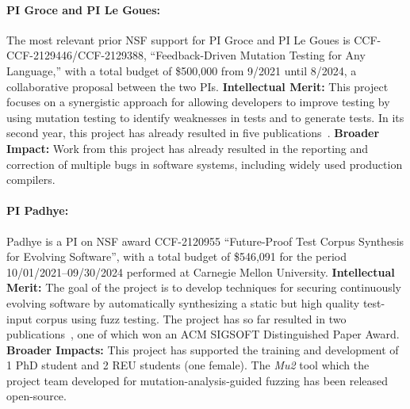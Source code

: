\paragraph{PI Groce and PI Le Goues:}
The most relevant prior NSF support for PI Groce and PI Le Goues is CCF-
CCF-2129446/CCF-2129388, ``Feedback-Driven Mutation Testing for Any Language,'' with a 
total budget of \$500,000 from 9/2021 until 8/2024,
a collaborative proposal between the two PIs. {\bf Intellectual Merit:} This project
focuses on a synergistic approach for allowing developers
to improve testing by using mutation testing to identify
weaknesses in tests and to generate tests.  In its second
year,  this project has already resulted in five
publications~\cite{cc2022,seip2022,fuzzing22,fse23,issre23}. {\bf
  Broader
  Impact:}  Work from this project has already
resulted in the reporting and correction of multiple bugs in software
systems, including widely used production compilers.


\paragraph{PI Padhye:}

Padhye is a PI on NSF award CCF-2120955 ``Future-Proof Test Corpus Synthesis for Evolving Software'',
with a total budget of 	\$546,091 for the period 10/01/2021--09/30/2024 performed 
at Carnegie Mellon University. 
{\bf Intellectual Merit:} The goal of the project is to develop techniques for securing continuously evolving software 
by automatically synthesizing a static but high quality test-input corpus using 
fuzz testing. The project has so far resulted in two publications~\cite{naturalfuzz, mu2}, one
of which won an ACM SIGSOFT Distinguished Paper Award. {\bf Broader Impacts:} 
This project has supported the training and development of 1 PhD student and 
2 REU students (one female). The \emph{Mu2} tool which the project team developed
for mutation-analysis-guided fuzzing has been released open-source. 

